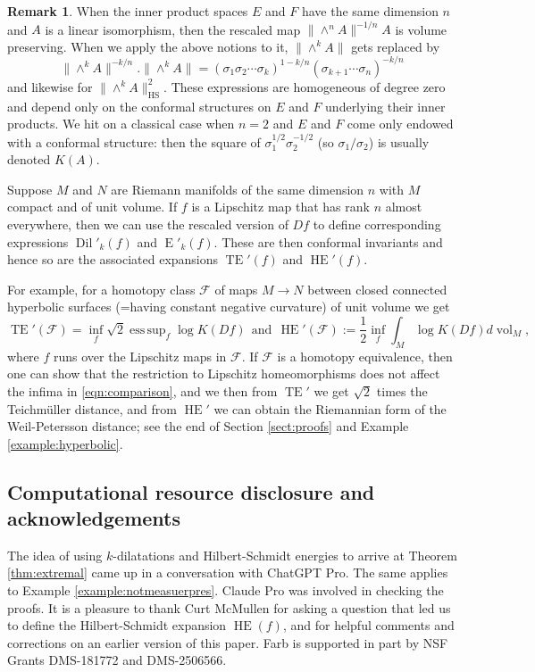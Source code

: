 \documentclass[11pt,letterpaper]{amsart}
\theoremstyle{definition}
\numberwithin{equation}{section}
\theoremstyle{definition}
\newtheorem{remark}[theorem]{Remark}
\newcommand{\Fc}{\mathcal{F}}
\DeclareMathOperator{\En}{E}
\DeclareMathOperator{\HS}{HS}
\DeclareMathOperator*{\esssup}{ess\,sup}
\DeclareMathOperator{\TE}{TE}
\DeclareMathOperator{\HE}{HE}
\newcommand{\Dil}{\operatorname{Dil}}
\newcommand{\vol}{\operatorname{vol}}
\begin{document}
\begin{remark}\label{rem:qc}
When the inner product spaces $E$ and $F$ have the same dimension $n$ and $A$ is a linear isomorphism, then  the rescaled map $\|\wedge^n A\|^{-1/n} A$ is volume  preserving.  When we apply the  above notions  to it, 
$\|\wedge^kA\|$ gets replaced by 
\[
\|\wedge^kA\|^{-k/n}.\|\wedge^kA\|=
(\sigma_1\sigma_2\cdots\sigma_k)^{1-k/n}(\sigma_{k+1}\cdots \sigma_n)^{-k/n}
\]
and likewise 
for  $\|\wedge^kA\|^2_{\HS}$. These expressions are homogeneous of degree zero and  depend only on the  conformal structures on $E$ and $F$ underlying their inner products.
We hit on a classical case when $n=2$ and $E$ and $F$ come only  endowed with a conformal structure: then the square of $\sigma_1^{1/2}\sigma_2^{-1/2}$ (so  $\sigma_1/\sigma_2$) is  usually denoted $K(A)$.

Suppose $M$ and $N$  are Riemann manifolds of the same dimension $n$ with $M$ compact and of unit volume.
If $f$ is a Lipschitz  map that has rank $n$ almost everywhere, then we can use the rescaled version of $Df$ to define 
corresponding expressions  $\Dil'_k(f)$ and $\En'_k(f)$. These are then conformal invariants and  hence so are  the  associated expansions $\TE'(f)$  and $\HE'(f)$. 

For example, for a  homotopy class  $\Fc$ of  maps $M\to N$ between closed connected hyperbolic surfaces (=having constant negative curvature) of unit volume   we get
\begin{equation}\label{eqn:comparison}
\textstyle \TE'(\Fc)=\inf_{f}\sqrt{2}\esssup_f \log K(Df)\ \ \text{and} \ \ \HE'(\Fc):=\frac{1}{2}\inf_{f}\int_M \log K(Df) d\!\vol_M, 
\end{equation}
where $f$ runs over the Lipschitz maps in $\Fc$. If $\Fc$ is a homotopy equivalence, then one can show that the restriction to Lipschitz homeomorphisms does not affect  the infima in \eqref{eqn:comparison},  and we then from $\TE'$ we get $\sqrt{2}$ times  the Teichm\"uller distance, and from $\HE'$ we can obtain the Riemannian form of the Weil-Petersson distance; see 
the end of Section \ref{sect:proofs} and Example \ref{example:hyperbolic}.
\end{remark}

\subsection{Computational resource disclosure and acknowledgements} The idea of using $k$-dilatations and Hilbert-Schmidt energies to arrive at Theorem \ref{thm:extremal}  came up  in a  conversation with  ChatGPT Pro. The same applies to Example \ref{example:notmeasuerpres}. Claude Pro was involved in checking the proofs.  It is a pleasure to thank Curt McMullen for asking a question that led us to define the Hilbert-Schmidt expansion $\HE(f)$, and for helpful comments and corrections on an earlier version of this paper. Farb is supported in part by NSF Grants DMS-181772 and DMS-2506566.
\end{document}
